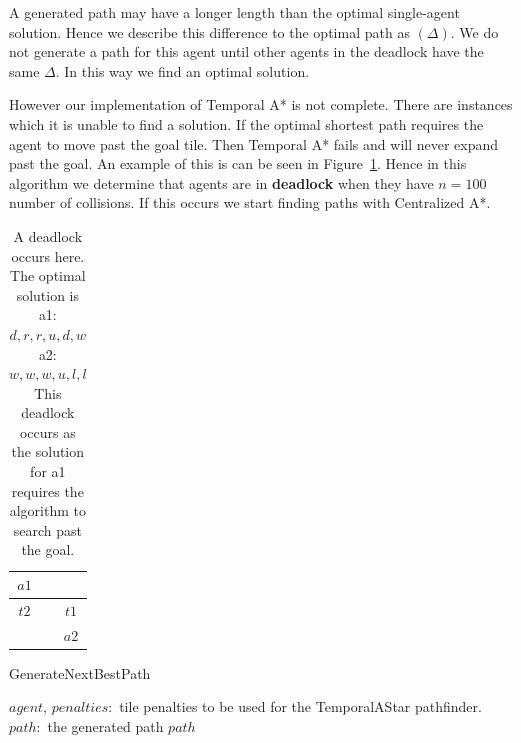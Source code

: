 \documentclass[a4paper,11pt]{article}
\let\oldReturn\Return
\renewcommand{\Return}{\State\oldReturn}
\begin{document}
A generated path may have a longer length than the optimal single-agent solution. Hence we describe this difference to the optimal path as $(\Delta)$. We do not generate a path for this agent until other agents in the deadlock have the same $\Delta$. In this way we find an optimal solution.

However our implementation of Temporal A* is not complete. There are instances which it is unable to find a solution. If the optimal shortest path requires the agent to move past the goal tile. Then Temporal A* fails and will never expand past the goal. An example of this is can be seen in Figure~\ref{fig:deadlock}. Hence in this algorithm we determine that agents are in \textbf{deadlock} when they have $n=100$ number of collisions. If this occurs we start finding paths with Centralized A*. 


\begin{table}[h]
	\centering
	\footnotesize
	\begin{tabular}{|c|c|c|}
		\hline
		$a1$ & \cellcolor{black} & \\ \hline
		$t2$ & & $t1$ \\ \hline
		& \cellcolor{black} & $a2$ \\ \hline
	\end{tabular}

	\caption{A deadlock occurs here. The optimal solution is 
		\\ a1: $d,r,r,u,d,w$
		\\ a2: $w,w,w,u,l,l$
		\\ This deadlock occurs as the solution for a1 requires the algorithm to search past the goal.}
	\label{fig:deadlock}
\end{table}


\begin{algorithm}[H]
	\caption{GenerateNextBestPath}\label{alg:generate-paths}
	\begin{algorithmic}[1]
		\Require $agent$, $penalties:$ tile penalties to be used for the TemporalAStar pathfinder.
		\Ensure $path:$ the generated path
			\Else
			\EndIf
			\Return $path$
		\EndFor
	\end{algorithmic}
\end{algorithm}
\end{document}
